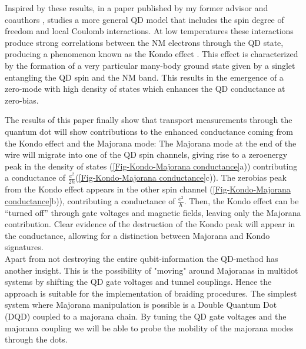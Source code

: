 Inspired by these results, in a paper published by my former advisor
and coauthors \citep{ruiz-tijerina_interaction_2015}, \citeauthor{ruiz-tijerina_interaction_2015}
studies a more general QD model that includes the spin degree of freedom
and local Coulomb interactions. At low temperatures these interactions produce strong correlations
between the NM electrons through the QD state, producing a phenomenon
known as the Kondo effect \citep{hewson_kondo_1997}. This effect
is characterized by the formation of a very particular many-body ground state given by
a singlet entangling the QD spin and the NM band. This results in the emergence of a zero-mode with high density of states which enhances the QD conductance at zero-bias.


The results of this paper finally show that transport measurements
through the quantum dot will show contributions to the enhanced conductance
coming from the Kondo effect and the Majorana mode: The Majorana mode
at the end of the wire will migrate into one of the QD spin channels,
giving rise to a zero\textendash energy peak in the density of states
(\ref{Fig-Kondo-Majorana conductance}a)) contributing a conductance
of $\frac{e^{2}}{2h}$(\ref{Fig-Kondo-Majorana conductance}c)). The
zero\textendash bias peak from the Kondo effect appears in the other
spin channel (\ref{Fig-Kondo-Majorana conductance}b)), contributing
a conductance of $\frac{e^{2}}{h}$. Then, the Kondo effect can be
\textquotedblleft turned off\textquotedblright{} through gate voltages
and magnetic fields, leaving only the Majorana contribution. Clear
evidence of the destruction of the Kondo peak will appear in the conductance,
allowing for a distinction between Majorana and Kondo signatures.\\



 Apart from not destroying the entire qubit-information the QD-method has another insight.  This is the possibility of "moving" around Majoranas  in multidot systems by shifting the QD gate voltages and tunnel couplings. Hence the approach is suitable for the implementation of braiding procedures. The simplest system where Majorana manipulation is possible is  a  Double Quantum Dot (DQD) coupled to a majorana chain. By tuning the QD gate voltages and the majorana coupling we will be able to probe the mobility of the majorana modes through the dots. 
 
